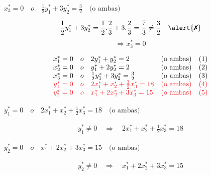\documentclass[10pt, aspectratio=169,usenames,dvipsnames]{beamer}
\begin{document}
\begin{frame}{}
    \begin{tcolorbox}
        \centering
        $x_3^*=0 \quad o \quad \frac{1}{2}y_1^*+3y_2^*=\frac{3}{2} \quad \text{(o ambas)}$    
    \end{tcolorbox}

    \begin{align*}
        \frac{1}{2}y_1^*+3y_2^*=\frac{1}{2}.\frac{2}{3}+3.\frac{2}{3}=\frac{7}{3}\neq\frac{3}{2} \quad \text{\alert{\ding{55}}}
    \end{align*}
    $$\Longrightarrow x_3^*=0$$
\end{frame}

\begin{frame}{}
        $$
\begin{array}{cclcc}
     x_1^*=0 & o & 2y_1^*+y_2^*=2 & \text{(o ambas)} & (1) \\
     x_2^*=0 & o & y_1^*+2y_2^*=2 & \text{(o ambas)} & (2) \\
     x_3^*=0 & o & \frac{1}{2}y_1^*+3y_2^*=\frac{3}{2} & \text{(o ambas)} & (3) \\
     \color{Red}y_1^*=0 & \color{Red}o & \color{Red}2x_1^*+x_2^*+\frac{1}{2}x_3^*=18 & \color{Red}\text{(o ambas)} & \color{Red}(4) \\
     \color{Red}y_2^*=0 & \color{Red}o & \color{Red}x_1^*+2x_2^*+3x_3^*=15 & \color{Red}\text{(o ambas)} & \color{Red}(5) \\
\end{array}
$$
\end{frame}

\begin{frame}{}
    \begin{tcolorbox}\centering
     $y_1^*=0 \quad o \quad 2x_1^*+x_2^*+\frac{1}{2}x_3^*=18 \quad \text{(o ambas)}$
    \end{tcolorbox}
    \begin{align*}
        y_1^*\neq0 \quad \Longrightarrow \quad 2x_1^*+x_2^*+\frac{1}{2}x_3^*=18
    \end{align*}
    
    \pause
    \begin{tcolorbox}
    \centering
    $    y_2^*=0 \quad o \quad x_1^*+2x_2^*+3x_3^*=15 \quad \text{(o ambas)}$
    \end{tcolorbox}
    \begin{align*}
        y_2^*\neq0 \quad \Longrightarrow \quad x_1^*+2x_2^*+3x_3^*=15
    \end{align*}
    
\end{frame}
\end{document}
